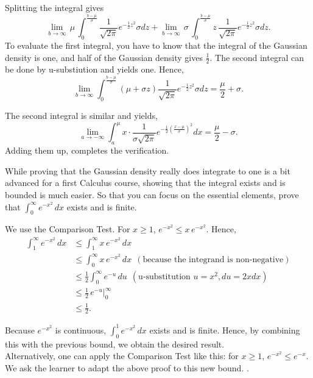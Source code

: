 Splitting the integral gives
\[  \lim_{b \to \infty}\, \mu \, \int_{0}^{\frac{b-\mu}{\sigma}} \frac{1}{\sqrt{2\pi}} e^{-\frac{1}{2}z^2} \sigma dz + \lim_{b \to \infty}\, \sigma  \, \int_{0}^{\frac{b-\mu}{\sigma}} z\, \frac{1}{\sqrt{2\pi}} e^{-\frac{1}{2}z^2} \sigma dz. \]
To evaluate the first integral, you have to know that the integral of the Gaussian density is one, and half of the Gaussian density gives $\frac{1}{2}$. The second integral can be done by u-substiution and yields one. Hence, 
\[\lim_{b \to \infty} \int_{0}^{\frac{b-\mu}{\sigma}} (\mu + \sigma z) \frac{1}{\sqrt{2\pi}} e^{-\frac{1}{2}z^2} \sigma dz = \frac{\mu}{2} + \sigma. \]

The second integral is similar and yields, 
$$\lim_{a \to -\infty} \int_{a}^{\mu} x \cdot \frac{1}{\sigma\sqrt{2\pi}} e^{-\frac{1}{2}\left(\frac{x-\mu}{\sigma}\right)^2} dx = \frac{\mu}{2} - \sigma.$$
Adding them up, completes the verification.


\Qed

\bigskip 
\begin{example} While proving that the Gaussian density really does integrate to one is a bit advanced for a first Calculus course, showing that the integral exists and is bounded is much easier. So that you can focus on the essential elements, prove that $\int_0^\infty e^{-x^2} \, dx$ exists and is finite.    
\end{example}
\solution We use the Comparison Test. For $x\ge 1$, $e^{-x^2} \le x\, e^{-x^2}$. Hence, 
\begin{align*}
    \int_1^\infty e^{-x^2} \, dx & \le \int_1^\infty x \, e^{-x^2} \, dx \\[1em]
    &\le  \int_0^\infty x \, e^{-x^2} \, dx ~~(\text{because the integrand is non-negative}) \\[1em] 
    & \le  \frac{1}{2} \int_0^\infty e^{-u} \, du ~~(\text{u-substitution } u = x^2, du = 2x dx) \\[1em]
    &\le  \frac{1}{2}\, e^{-u} \Big|_{0}^{\infty} \\[1em]
    &\le  \frac{1}{2}.
\end{align*}

Because $e^{-x^2}$ is continuous, $\int_0^1 e^{-x^2} \, dx$ exists and is finite. Hence, by combining this with the previous bound, we obtain the desired result.\\

Alternatively, one can apply the Comparison Test like this: for $x\ge 1$, $e^{-x^2} \le e^{-x}$. We ask the learner to adapt the above proof to this new bound.
\Qed.

